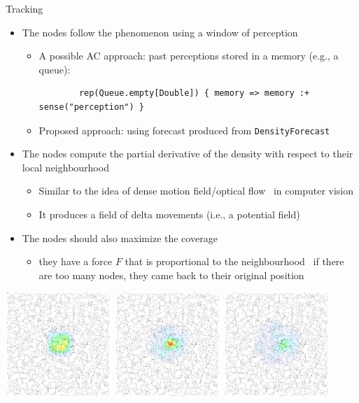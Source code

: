 \documentclass[presentation, 9pt]{beamer}\mode<presentation>{\usetheme{AMSBolognaFC}}
\begin{document}
\begin{frame}[fragile]{Tracking}
\begin{itemize}
	\item The nodes follow the phenomenon using a window of perception
	\begin{itemize}
		\item A possible AC approach: past perceptions stored in a memory (e.g., a queue):
		\begin{verbatim}
		rep(Queue.empty[Double]) { memory => memory :+ sense("perception") }
		\end{verbatim}
		\item Proposed approach: using forecast produced from \texttt{DensityForecast}
	\end{itemize} 
	\item The nodes compute the partial derivative of the density with respect to their local neighbourhood
	\begin{itemize}
		\item Similar to the idea of dense motion field/optical flow~ in computer vision
		\item It produces a field of delta movements (i.e., a potential field)
	\end{itemize}
	\item The nodes should also maximize the coverage
	\begin{itemize}
		\item they have a force $F$ that is proportional to the neighbourhood \faArrowRight \, if there are too many nodes, they came back to their original position 
	\end{itemize}
\end{itemize}
\centering
{
\includegraphics[width=0.3\textwidth]{img/step-1.png}
\includegraphics[width=0.3\textwidth]{img/step-2.png}
\includegraphics[width=0.3\textwidth]{img/step-3.png}
}
\end{frame}
\end{document}
